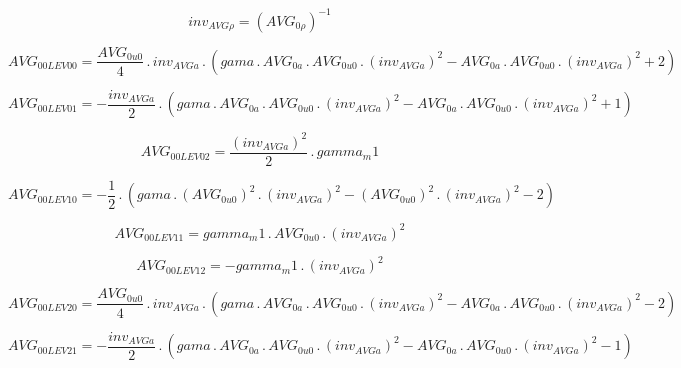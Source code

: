 \documentclass{article}
\begin{document}
\begin{dmath}inv_{AVG \rho} = \left(AVG_{0 \rho} \right)^{-1}\end{dmath}

\begin{dmath}AVG_{0 0 LEV 00} = \frac{AVG_{0 u0}}{4} \,.\, inv_{AVG a} \,.\, \left(gama \,.\, AVG_{0 a} \,.\, AVG_{0 u0} \,.\, \left(inv_{AVG a} \right)^{2} - AVG_{0 a} \,.\, AVG_{0 u0} \,.\, \left(inv_{AVG a} \right)^{2} + 2\right)\end{dmath}

\begin{dmath}AVG_{0 0 LEV 01} = - \frac{inv_{AVG a}}{2} \,.\, \left(gama \,.\, AVG_{0 a} \,.\, AVG_{0 u0} \,.\, \left(inv_{AVG a} \right)^{2} - AVG_{0 a} \,.\, AVG_{0 u0} \,.\, \left(inv_{AVG a} \right)^{2} + 1\right)\end{dmath}

\begin{dmath}AVG_{0 0 LEV 02} = \frac{\left(inv_{AVG a} \right)^{2}}{2} \,.\, gamma_m1\end{dmath}

\begin{dmath}AVG_{0 0 LEV 10} = - \frac{1}{2} \,.\, \left(gama \,.\, \left(AVG_{0 u0} \right)^{2} \,.\, \left(inv_{AVG a} \right)^{2} - \left(AVG_{0 u0} \right)^{2} \,.\, \left(inv_{AVG a} \right)^{2} - 2\right)\end{dmath}

\begin{dmath}AVG_{0 0 LEV 11} = gamma_m1 \,.\, AVG_{0 u0} \,.\, \left(inv_{AVG a} \right)^{2}\end{dmath}

\begin{dmath}AVG_{0 0 LEV 12} = - gamma_m1 \,.\, \left(inv_{AVG a} \right)^{2}\end{dmath}

\begin{dmath}AVG_{0 0 LEV 20} = \frac{AVG_{0 u0}}{4} \,.\, inv_{AVG a} \,.\, \left(gama \,.\, AVG_{0 a} \,.\, AVG_{0 u0} \,.\, \left(inv_{AVG a} \right)^{2} - AVG_{0 a} \,.\, AVG_{0 u0} \,.\, \left(inv_{AVG a} \right)^{2} - 2\right)\end{dmath}

\begin{dmath}AVG_{0 0 LEV 21} = - \frac{inv_{AVG a}}{2} \,.\, \left(gama \,.\, AVG_{0 a} \,.\, AVG_{0 u0} \,.\, \left(inv_{AVG a} \right)^{2} - AVG_{0 a} \,.\, AVG_{0 u0} \,.\, \left(inv_{AVG a} \right)^{2} - 1\right)\end{dmath}
\end{document}
